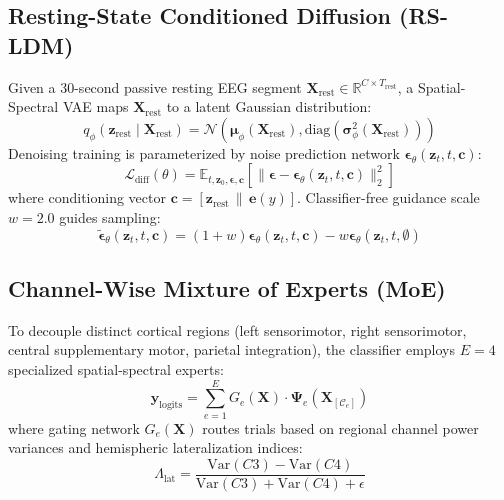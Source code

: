 \documentclass[journal,10pt]{IEEEtran}
\begin{document}
\subsection{Resting-State Conditioned Diffusion (RS-LDM)}
Given a 30-second passive resting EEG segment $\mathbf{X}_{\text{rest}} \in \mathbb{R}^{C \times T_{\text{rest}}}$, a Spatial-Spectral VAE maps $\mathbf{X}_{\text{rest}}$ to a latent Gaussian distribution:
\begin{equation}
q_\phi(\mathbf{z}_{\text{rest}} \mid \mathbf{X}_{\text{rest}}) = \mathcal{N}\left(\mathbf{\mu}_\phi(\mathbf{X}_{\text{rest}}), \text{diag}(\mathbf{\sigma}_\phi^2(\mathbf{X}_{\text{rest}}))\right)
\end{equation}
Denoising training is parameterized by noise prediction network $\mathbf{\epsilon}_\theta(\mathbf{z}_t, t, \mathbf{c})$:
\begin{equation}
\mathcal{L}_{\text{diff}}(\theta) = \mathbb{E}_{t, \mathbf{z}_0, \mathbf{\epsilon}, \mathbf{c}} \left[ \|\mathbf{\epsilon} - \mathbf{\epsilon}_\theta(\mathbf{z}_t, t, \mathbf{c})\|_2^2 \right]
\end{equation}
where conditioning vector $\mathbf{c} = [\mathbf{z}_{\text{rest}} \,\|\, \mathbf{e}(y)]$. Classifier-free guidance scale $w=2.0$ guides sampling:
\begin{equation}
\mathbf{\tilde{\epsilon}}_\theta(\mathbf{z}_t, t, \mathbf{c}) = (1 + w) \mathbf{\epsilon}_\theta(\mathbf{z}_t, t, \mathbf{c}) - w \mathbf{\epsilon}_\theta(\mathbf{z}_t, t, \emptyset)
\end{equation}

\subsection{Channel-Wise Mixture of Experts (MoE)}
To decouple distinct cortical regions (left sensorimotor, right sensorimotor, central supplementary motor, parietal integration), the classifier employs $E=4$ specialized spatial-spectral experts:
\begin{equation}
\mathbf{y}_{\text{logits}} = \sum_{e=1}^E G_e(\mathbf{X}) \cdot \mathbf{\Psi}_e(\mathbf{X}_{[\mathcal{C}_e]})
\end{equation}
where gating network $G_e(\mathbf{X})$ routes trials based on regional channel power variances and hemispheric lateralization indices:
\begin{equation}
\Lambda_{\text{lat}} = \frac{\text{Var}(C3) - \text{Var}(C4)}{\text{Var}(C3) + \text{Var}(C4) + \epsilon}
\end{equation}
\end{document}

